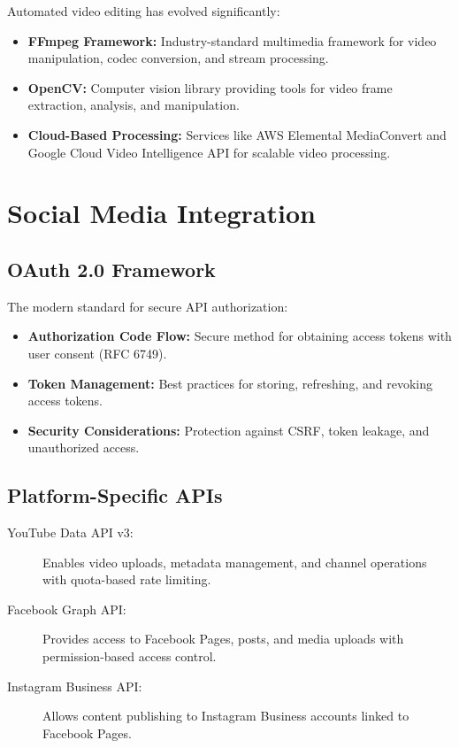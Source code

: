 Automated video editing has evolved significantly:

\begin{itemize}
    \item \textbf{FFmpeg Framework:} Industry-standard multimedia framework for video manipulation, codec conversion, and stream processing.
    
    \item \textbf{OpenCV:} Computer vision library providing tools for video frame extraction, analysis, and manipulation.
    
    \item \textbf{Cloud-Based Processing:} Services like AWS Elemental MediaConvert and Google Cloud Video Intelligence API for scalable video processing.
\end{itemize}

\section{Social Media Integration}

\subsection{OAuth 2.0 Framework}

The modern standard for secure API authorization:

\begin{itemize}
    \item \textbf{Authorization Code Flow:} Secure method for obtaining access tokens with user consent (RFC 6749).
    
    \item \textbf{Token Management:} Best practices for storing, refreshing, and revoking access tokens.
    
    \item \textbf{Security Considerations:} Protection against CSRF, token leakage, and unauthorized access.
\end{itemize}

\subsection{Platform-Specific APIs}

\begin{description}
    \item[YouTube Data API v3:] Enables video uploads, metadata management, and channel operations with quota-based rate limiting.
    
    \item[Facebook Graph API:] Provides access to Facebook Pages, posts, and media uploads with permission-based access control.
    
    \item[Instagram Business API:] Allows content publishing to Instagram Business accounts linked to Facebook Pages.
\end{description}

